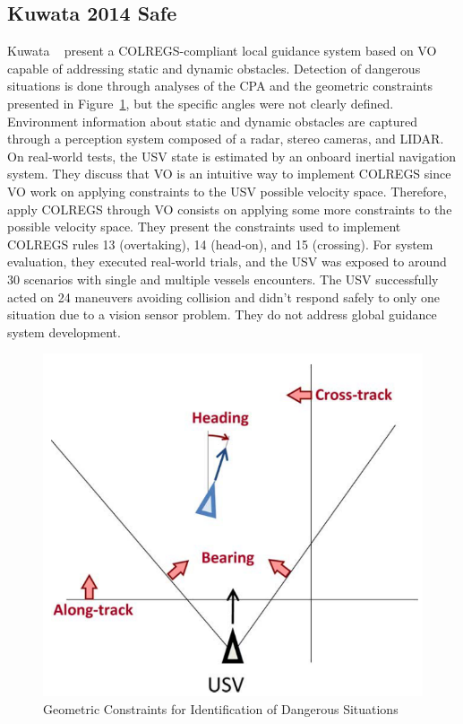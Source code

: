     \subsection{Kuwata 2014 Safe}
    Kuwata \etal~\cite{Kuwata2014Safe} present a \ac{COLREGS}-compliant local guidance system based on \ac{VO} capable of addressing static and dynamic obstacles. Detection of dangerous situations is done through analyses of the \ac{CPA} and the geometric constraints presented in Figure~\ref{fig:Kuwata2014Safe_GeometricConstraints}, but the specific angles were not clearly defined. Environment information about static and dynamic obstacles are captured through a perception system composed of a radar, stereo cameras, and \ac{LIDAR}. On real-world tests, the \ac{USV} state is estimated by an onboard inertial navigation system. They discuss that \ac{VO} is an intuitive way to implement \ac{COLREGS} since \ac{VO} work on applying constraints to the \ac{USV} possible velocity space. Therefore, apply \ac{COLREGS} through \ac{VO} consists on applying some more constraints to the possible velocity space. They present the constraints used to implement \ac{COLREGS} rules 13 (overtaking), 14 (head-on), and 15 (crossing). For system evaluation, they executed real-world trials, and the \ac{USV} was exposed to around 30 scenarios with single and multiple vessels encounters. The \ac{USV} successfully acted on 24 maneuvers avoiding collision and didn't respond safely to only one situation due to a vision sensor problem. They do not address global guidance system development.
    
    \begin{figure}[H]
        \centering
        \includegraphics[scale=0.4]{figs/Kuwata2014Safe_GeometricConstraints.png}
        \caption{Geometric Constraints for Identification of Dangerous Situations \cite{Kuwata2014Safe}}
        \label{fig:Kuwata2014Safe_GeometricConstraints}
    \end{figure}
    
